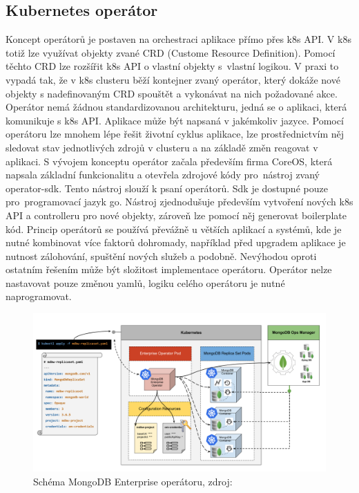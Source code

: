 \subsection{Kubernetes operátor}
Koncept operátorů je postaven na orchestraci aplikace přímo přes k8s API. V k8s totiž lze využívat objekty zvané CRD (Custome Resource Definition). Pomocí těchto CRD lze rozšířit k8s API o vlastní objekty s vlastní logikou. V praxi to vypadá tak, že v k8s clusteru běží kontejner zvaný operátor, který dokáže nové objekty s nadefinovaným CRD spouštět a vykonávat na nich požadované akce. Operátor nemá žádnou standardizovanou architekturu, jedná se o aplikaci, která komunikuje s k8s API. Aplikace může být napsaná v jakémkoliv jazyce. Pomocí operátoru lze mnohem lépe řešit životní cyklus aplikace, lze prostřednictvím něj sledovat stav jednotlivých zdrojů v clusteru a na základě změn reagovat v aplikaci. S vývojem konceptu operátor začala především firma CoreOS, která napsala základní funkcionalitu a otevřela zdrojové kódy pro nástroj zvaný operator-sdk. Tento nástroj slouží k psaní operátorů. Sdk je dostupné pouze pro programovací jazyk go. Nástroj zjednodušuje především vytvoření nových k8s API a controlleru pro nové objekty, zároveň lze pomocí něj generovat boilerplate kód. Princip operátorů se používá převážně u větších aplikací a systémů, kde je nutné kombinovat více faktorů dohromady, například před upgradem aplikace je nutnost zálohování, spuštění nových služeb a podobně. Nevýhodou oproti ostatním řešením může být složitost implementace operátoru. Operátor nelze nastavovat pouze změnou yamlů, logiku celého operátoru je nutné naprogramovat.

\begin{figure}[H]
\begin{centering}
\includegraphics[width=1\textwidth]{img/operator_schema.png}
\par\end{centering}
\caption{Schéma MongoDB Enterprise operátoru, zdroj:\cite{operator_mongodb}} \label{fig:operator_schema}
\end{figure}

